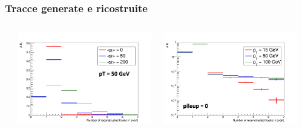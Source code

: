 \documentclass{beamer}
\begin{document}
\begin{frame}
\frametitle{Tracce generate e ricostruite}
\begin{columns}
\begin{column}{.09\textwidth}
\end{column}
\begin{column}{.41\textwidth}
\centering
\includegraphics[width=\textwidth]{Tracking/nRecoTracks}
\end{column}
\begin{column}{.41\textwidth}
\centering
\includegraphics[width=\textwidth]{Tracking/nRecoTracks_pt}
\end{column}
\begin{column}{.09\textwidth}
\end{column}
\end{columns}


\end{frame}
\end{document}

